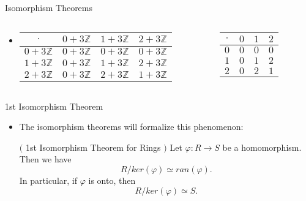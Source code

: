 \documentclass[ %
 10pt, xcolor={dvipsnames,svgnames,x11names,hyperref},
   hyperref={colorlinks=true,citecolor=green,linkcolor=DarkRed,urlcolor=ProcessBlue,anchorcolor=blue}
  ]{beamer}
\newenvironment{stepitemize}{\begin{itemize}[<+->]}{\end{itemize} }
\newcommand{\Z}{\mathbb{Z}}
\begin{document}
\begin{frame}{Isomorphism Theorems}
\begin{stepitemize}
\item[]
\begin{columns}
        \begin{column}{0.4\textwidth}
     \begin{table}
\begin{tabular}{ c| c | c | c}
$\cdot$  & {\color{blue} $0+3\Z$} & {\color{red} $1+3\Z$} & {\color{teal}$2+3\Z$} \\
\hline
{\color{blue} $0+3\Z$} & {\color{blue} $0+3\Z$} & {\color{blue} $0+3\Z$} & {\color{blue} $0+3\Z$}  \\
\hline
{\color{red} $1+3\Z$} & {\color{blue}$0+3\Z$} & {\color{red} $1+3\Z$} & {\color{teal}$2+3\Z$}  \\
\hline
{\color{teal} $2+3\Z$} & {\color{blue} $0+3\Z$} & {\color{teal}$2+3\Z$} & {\color{red} $1+3\Z$} \\
\hline
\end{tabular}
\end{table}
    \end{column}

        \begin{column}{0.4\textwidth}
    \begin{table}
\begin{tabular}{ c| c | c | c}
$\cdot$ & {\color{blue} $0$}& {\color{red} $1$} & {\color{teal} $2$} \\
\hline
{\color{blue} $0$} & {\color{blue}$0$} & {\color{blue}$0$} & {\color{blue}$0$}  \\
\hline
{\color{red} $1$} & {\color{blue} $0$} & {\color{red} $1$} & {\color{teal} $2$}  \\
\hline
{\color{teal} $2$} & {\color{blue} $0$} & {\color{teal} $2$} & {\color{red} $1$} \\
\hline
\end{tabular}
\end{table}
    \end{column}
\end{columns}

\end{stepitemize}
\end{frame}

\begin{frame}{1st Isomorphism Theorem}
    \begin{stepitemize}
        \item The isomorphism theorems will formalize this phenomenon:
\begin{theorem}$($ 1st Isomorphism Theorem for Rings $)$
Let $\varphi: R\rightarrow S$ be a homomorphism. Then we have
$$R/ker(\varphi) \simeq ran(\varphi).$$
In particular, if $\varphi$ is onto, then
$$R/ker(\varphi) \simeq S. $$
\end{theorem}
    \end{stepitemize}
\end{frame}
\end{document}
